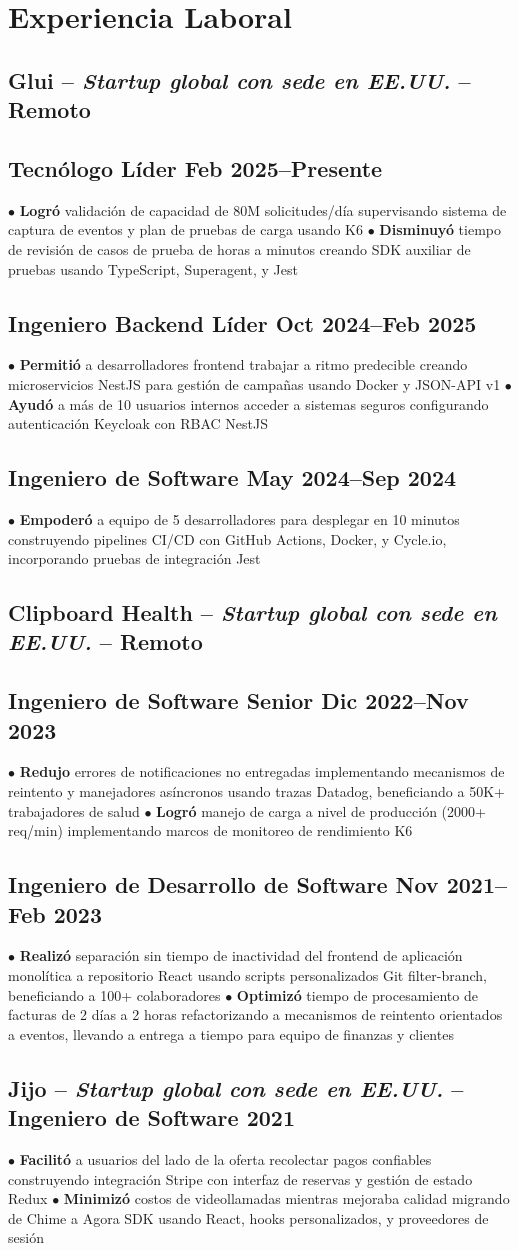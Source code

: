 \documentclass[10pt,a4paper]{article}
\newcommand{\actionverb}[1]{\textcolor{actioncolor}{\textbf{#1}}}
\newcommand{\cvcompany}[3]{
  \subsection{#1 \textcolor{mediumgray}{#2} \textcolor{mediumgray}{\footnotesize -- Remoto}}
  #3
}
\newcommand{\cvrole}[3]{
  \subsection{#1 \hfill {\footnotesize\textcolor{mediumgray}{#2}}}
  {\footnotesize #3}
  \vspace{0.2em}
}
\newcommand{\cvsinglecompany}[5]{
  \subsection{#1 \textcolor{mediumgray}{#2} -- \textbf{\small #3} \hfill {\footnotesize\textcolor{mediumgray}{#4}}}
  {\footnotesize #5}
  \vspace{0.2em}
}
\begin{document}
\section{Experiencia Laboral}

\cvcompany{Glui}{-- \textit{Startup global con sede en EE.UU.}}{
  \cvrole{Tecnólogo Líder}{Feb 2025--Presente}{
$\bullet$ \actionverb{Logró} validación de capacidad de 80M solicitudes/día supervisando sistema de captura de eventos y plan de pruebas de carga usando K6 $\bullet$ \actionverb{Disminuyó} tiempo de revisión de casos de prueba de horas a minutos creando SDK auxiliar de pruebas usando TypeScript, Superagent, y Jest
  }
  
  \cvrole{Ingeniero Backend Líder}{Oct 2024--Feb 2025}{
$\bullet$ \actionverb{Permitió} a desarrolladores frontend trabajar a ritmo predecible creando microservicios NestJS para gestión de campañas usando Docker y JSON-API v1 $\bullet$ \actionverb{Ayudó} a más de 10 usuarios internos acceder a sistemas seguros configurando autenticación Keycloak con RBAC NestJS
  }
  
  \cvrole{Ingeniero de Software}{May 2024--Sep 2024}{
$\bullet$ \actionverb{Empoderó} a equipo de 5 desarrolladores para desplegar en 10 minutos construyendo pipelines CI/CD con GitHub Actions, Docker, y Cycle.io, incorporando pruebas de integración Jest
  }
}

\cvcompany{Clipboard Health}{-- \textit{Startup global con sede en EE.UU.}}{
  \cvrole{Ingeniero de Software Senior}{Dic 2022--Nov 2023}{
$\bullet$ \actionverb{Redujo} errores de notificaciones no entregadas implementando mecanismos de reintento y manejadores asíncronos usando trazas Datadog, beneficiando a 50K+ trabajadores de salud $\bullet$ \actionverb{Logró} manejo de carga a nivel de producción (2000+ req/min) implementando marcos de monitoreo de rendimiento K6
  }
  
  \cvrole{Ingeniero de Desarrollo de Software}{Nov 2021--Feb 2023}{
$\bullet$ \actionverb{Realizó} separación sin tiempo de inactividad del frontend de aplicación monolítica a repositorio React usando scripts personalizados Git filter-branch, beneficiando a 100+ colaboradores $\bullet$ \actionverb{Optimizó} tiempo de procesamiento de facturas de 2 días a 2 horas refactorizando a mecanismos de reintento orientados a eventos, llevando a entrega a tiempo para equipo de finanzas y clientes
  }
}

\cvsinglecompany{Jijo}{-- \textit{Startup global con sede en EE.UU.}}{Ingeniero de Software}{2021}{
$\bullet$ \actionverb{Facilitó} a usuarios del lado de la oferta recolectar pagos confiables construyendo integración Stripe con interfaz de reservas y gestión de estado Redux $\bullet$ \actionverb{Minimizó} costos de videollamadas mientras mejoraba calidad migrando de Chime a Agora SDK usando React, hooks personalizados, y proveedores de sesión
}
\end{document}
